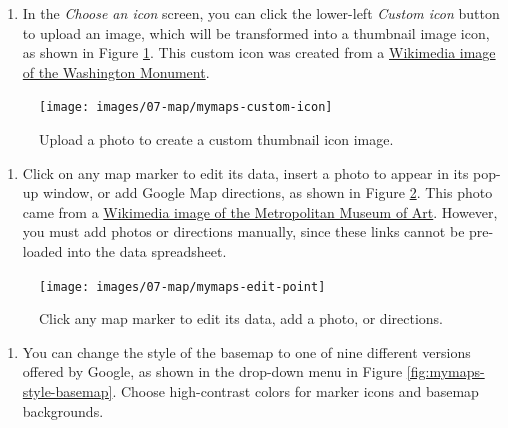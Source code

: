 \documentclass[
  english,
]{book}
\providecommand{\tightlist}{%
  \setlength{\itemsep}{0pt}\setlength{\parskip}{0pt}}
\begin{document}
\begin{enumerate}
\def\labelenumi{\arabic{enumi}.}
\setcounter{enumi}{12}
\tightlist
\item
  In the \emph{Choose an icon} screen, you can click the lower-left \emph{Custom icon} button to upload an image, which will be transformed into a thumbnail image icon, as shown in Figure \ref{fig:mymaps-custom-icon}. This custom icon was created from a \href{https://commons.wikimedia.org/wiki/File:Washington_Monument_Panorama.jpg}{Wikimedia image of the Washington Monument}.
\end{enumerate}



\begin{figure}
\texttt{[image: images/07-map/mymaps-custom-icon]} \caption{Upload a photo to create a custom thumbnail icon image.}\label{fig:mymaps-custom-icon}
\end{figure}

\begin{enumerate}
\def\labelenumi{\arabic{enumi}.}
\setcounter{enumi}{13}
\tightlist
\item
  Click on any map marker to edit its data, insert a photo to appear in its pop-up window, or add Google Map directions, as shown in Figure \ref{fig:mymaps-edit-point}. This photo came from a \href{https://commons.wikimedia.org/wiki/File:Metropolitan_Museum_of_Art_entrance_NYC.JPG}{Wikimedia image of the Metropolitan Museum of Art}. However, you must add photos or directions manually, since these links cannot be pre-loaded into the data spreadsheet.
\end{enumerate}



\begin{figure}
\texttt{[image: images/07-map/mymaps-edit-point]} \caption{Click any map marker to edit its data, add a photo, or directions.}\label{fig:mymaps-edit-point}
\end{figure}

\begin{enumerate}
\def\labelenumi{\arabic{enumi}.}
\setcounter{enumi}{14}
\tightlist
\item
  You can change the style of the basemap to one of nine different versions offered by Google, as shown in the drop-down menu in Figure \ref{fig:mymaps-style-basemap}. Choose high-contrast colors for marker icons and basemap backgrounds.
\end{enumerate}
\end{document}
